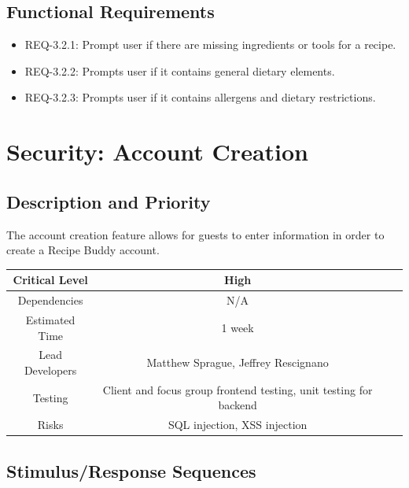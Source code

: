 \documentclass{scrreprt}
\begin{document}
\subsection{Functional Requirements}

\begin{itemize}
    \item REQ-3.2.1: Prompt user if there are missing ingredients or tools for a recipe.
    \item REQ-3.2.2: Prompts user if it contains general dietary elements.
    \item REQ-3.2.3: Prompts user if it contains allergens and dietary restrictions.
\end{itemize}

\section{Security: Account Creation}

\subsection{Description and Priority}

The account creation feature allows for guests to enter information in order to create a Recipe Buddy account.

\begin{center}
    \begin{tabular}{| c | c | c | c |}
        \hline
        Critical Level  & High                                                              \\
        \hline
        Dependencies    & N/A                                                               \\
        \hline
        Estimated Time  & 1 week                                                            \\
        \hline
        Lead Developers & Matthew Sprague, Jeffrey Rescignano                               \\
        \hline
        Testing         & Client and focus group frontend testing, unit testing for backend \\
        \hline
        Risks           & SQL injection, XSS injection                                      \\
        \hline
    \end{tabular}
\end{center}

\subsection{Stimulus/Response Sequences}
\end{document}

